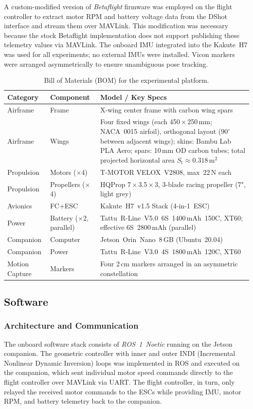 A custom-modified version of \textit{Betaflight} firmware was employed on the flight controller to extract motor RPM and battery voltage data from the DShot interface and stream them over MAVLink. This modification was necessary because the stock Betaflight implementation does not support publishing these telemetry values via MAVLink. The onboard IMU integrated into the Kakute~H7 was used for all experiments; no external IMUs were installed. Vicon markers were arranged asymmetrically to ensure unambiguous pose tracking.

\begin{table}[h]
\centering
\caption{Bill of Materials (BOM) for the experimental platform.}
\label{tab:bom}
\small
\begin{tabularx}{\textwidth}{ll>{\raggedright\arraybackslash}X}
\toprule
Category & Component & Model / Key Specs \\
\midrule
Airframe & Frame & X-wing center frame with carbon wing spars \\
Airframe & Wings & Four fixed wings (each 450\,×\,250\,mm; NACA~0015 airfoil), orthogonal layout ($90^{\circ}$ between adjacent wings); skins: Bambu Lab PLA Aero; spars: 10\,mm OD carbon tubes; total projected horizontal area $S_\mathrm{t}\approx 0.318$\,m$^2$ \\
Propulsion & Motors ($\times$4) & T-MOTOR VELOX~V2808, max~22\,N each \\
Propulsion & Propellers ($\times$4) & HQProp 7\,×\,3.5\,×\,3, 3-blade racing propeller (7", light grey) \\
Avionics & FC+ESC & Kakute~H7~v1.5 Stack (4-in-1~ESC) \\
Power & Battery ($\times$2, parallel) & Tattu~R-Line~V5.0~6S~1400\,mAh~150C, XT60; effective 6S~2800\,mAh (parallel) \\
Companion & Computer & Jetson~Orin~Nano~8\,GB (Ubuntu~20.04) \\
Companion & Power & Tattu~R-Line~V3.0~4S~1800\,mAh~120C, XT60 \\
Motion Capture & Markers & Four 2\,cm markers arranged in an asymmetric constellation \\
\bottomrule
\end{tabularx}
\end{table}

\subsection{Software}

\subsubsection{Architecture and Communication}
The onboard software stack consists of \textit{ROS~1~Noetic} running on the Jetson companion. The geometric controller with inner and outer INDI (Incremental Nonlinear Dynamic Inversion) loops was implemented in ROS and executed on the companion, which sent individual motor speed commands directly to the flight controller over MAVLink via UART. The flight controller, in turn, only relayed the received motor commands to the ESCs while providing IMU, motor RPM, and battery telemetry back to the companion.

